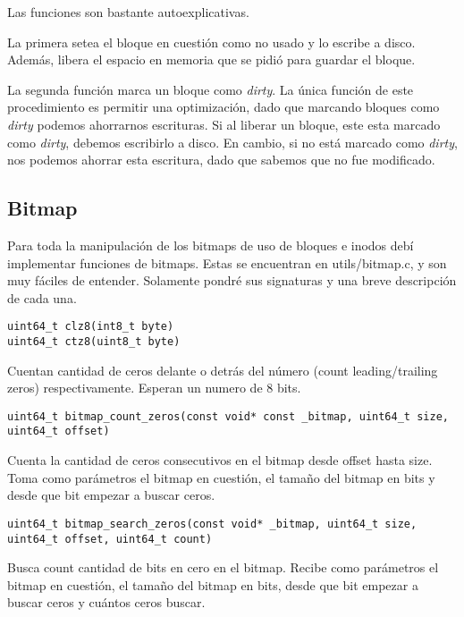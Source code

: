 Las funciones son bastante autoexplicativas.

La primera setea el bloque en cuestión como no usado y lo escribe a disco. Además, libera el espacio en memoria que se pidió para guardar el bloque.

La segunda función marca un bloque como \emph{dirty}. La única función de este procedimiento es permitir una optimización, dado que marcando bloques como \emph{dirty} podemos ahorrarnos escrituras.
Si al liberar un bloque, este esta marcado como \emph{dirty}, debemos escribirlo a disco. En cambio, si no está marcado como \emph{dirty}, nos podemos ahorrar esta escritura, dado que sabemos que no fue modificado.


\subsection{Bitmap}

Para toda la manipulación de los bitmaps de uso de bloques e inodos debí implementar funciones de bitmaps. Estas se encuentran en utils/bitmap.c, y son muy fáciles de entender. Solamente pondré sus signaturas y una breve descripción de cada una.


\begin{lstlisting}[style=customc]
uint64_t clz8(int8_t byte)
uint64_t ctz8(uint8_t byte)
\end{lstlisting}

Cuentan cantidad de ceros delante o detrás del número (count leading/trailing zeros) respectivamente. Esperan un numero de 8 bits.




\begin{lstlisting}[style=customc]
uint64_t bitmap_count_zeros(const void* const _bitmap, uint64_t size, uint64_t offset)
\end{lstlisting}

Cuenta la cantidad de ceros consecutivos en el bitmap desde offset hasta size.
Toma como parámetros el bitmap en cuestión, el tamaño del bitmap en bits y desde que bit empezar a buscar ceros.



\begin{lstlisting}[style=customc]
uint64_t bitmap_search_zeros(const void* _bitmap, uint64_t size, uint64_t offset, uint64_t count)
\end{lstlisting}

Busca count cantidad de bits en cero en el bitmap. Recibe como parámetros el bitmap en cuestión, el tamaño del bitmap en bits, desde que bit empezar a buscar ceros y cuántos ceros buscar.

